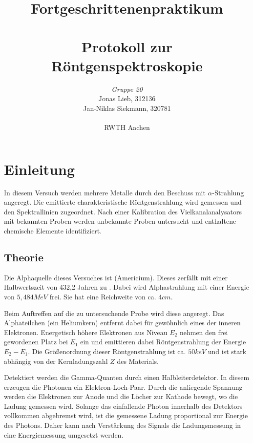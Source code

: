 \documentclass{../Misc/MontavonLaTeX/Montavon}
\begin{document}
\title{Fortgeschrittenenpraktikum \\ \quad \\ Protokoll zur Röntgenspektroskopie }
\author{\emph{Gruppe 20} \\  Jonas Lieb, 312136 \\ Jan-Niklas Siekmann, 320781 \\ \ \\  RWTH Aachen}
\maketitle
\newpage

\tableofcontents
\newpage

\section{Einleitung}
In diesem Versuch werden mehrere Metalle durch den Beschuss mit $\alpha$-Strahlung angeregt. Die emittierte charakteristische Röntgenstrahlung wird gemessen und den Spektrallinien zugeordnet. Nach einer Kalibration des Vielkanalanalysators mit bekannten Proben werden unbekannte Proben untersucht und enthaltene chemische Elemente identifiziert.

\subsection{Theorie}
Die Alphaquelle dieses Versuches ist  (Americium). Dieses zerfällt mit einer Halbwertszeit von 432,2 Jahren zu . Dabei wird Alphastrahlung mit einer Energie von $5,484 \unit{MeV}$ frei. Sie hat eine Reichweite von ca. $4 \unit{cm}$. 

Beim Auftreffen auf die zu untersuchende Probe wird diese angeregt. Das Alphateilchen (ein Heliumkern) entfernt dabei für gewöhnlich eines der inneren Elektronen. Energetisch höhere Elektronen aus Niveau $E_2$ nehmen den frei gewordenen Platz bei $E_1$ ein und emittieren dabei Röntgenstrahlung der Energie $E_2 - E_1$. Die Größenordnung dieser Röntgenstrahlung ist ca. $50 \unit{keV}$ und ist stark abhängig von der Kernladungszahl $Z$ des Materials.

Detektiert werden die Gamma-Quanten durch einen Halbleiterdetektor. In diesem erzeugen die Photonen ein Elektron-Loch-Paar. Durch die anliegende Spannung werden die Elektronen zur Anode und die Löcher zur Kathode bewegt, wo die Ladung gemessen wird. 
Solange das einfallende Photon innerhalb des Detektors vollkommen abgebremst wird, ist die gemessene Ladung proportional zur Energie des Photons. 
Daher kann nach Verstärkung des Signals die Ladungsmessung in eine Energiemessung umgesetzt werden.
\end{document}
